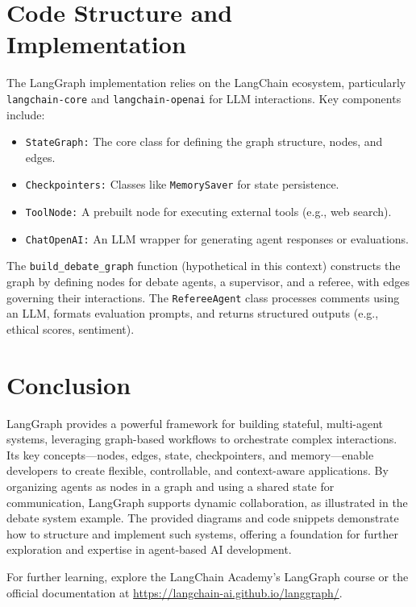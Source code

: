 \documentclass{article}
\begin{document}
\section{Code Structure and Implementation}

The LangGraph implementation relies on the LangChain ecosystem, particularly \texttt{langchain-core} and \texttt{langchain-openai} for LLM interactions. Key components include:

\begin{itemize}
    \item \texttt{StateGraph:} The core class for defining the graph structure, nodes, and edges.
    \item \texttt{Checkpointers:} Classes like \texttt{MemorySaver} for state persistence.
    \item \texttt{ToolNode:} A prebuilt node for executing external tools (e.g., web search).
    \item \texttt{ChatOpenAI:} An LLM wrapper for generating agent responses or evaluations.
\end{itemize}

The \texttt{build\_debate\_graph} function (hypothetical in this context) constructs the graph by defining nodes for debate agents, a supervisor, and a referee, with edges governing their interactions. The \texttt{RefereeAgent} class processes comments using an LLM, formats evaluation prompts, and returns structured outputs (e.g., ethical scores, sentiment).

\section{Conclusion}

LangGraph provides a powerful framework for building stateful, multi-agent systems, leveraging graph-based workflows to orchestrate complex interactions. Its key concepts—nodes, edges, state, checkpointers, and memory—enable developers to create flexible, controllable, and context-aware applications. By organizing agents as nodes in a graph and using a shared state for communication, LangGraph supports dynamic collaboration, as illustrated in the debate system example. The provided diagrams and code snippets demonstrate how to structure and implement such systems, offering a foundation for further exploration and expertise in agent-based AI development.

For further learning, explore the LangChain Academy’s LangGraph course or the official documentation at \url{https://langchain-ai.github.io/langgraph/}.
\end{document}
